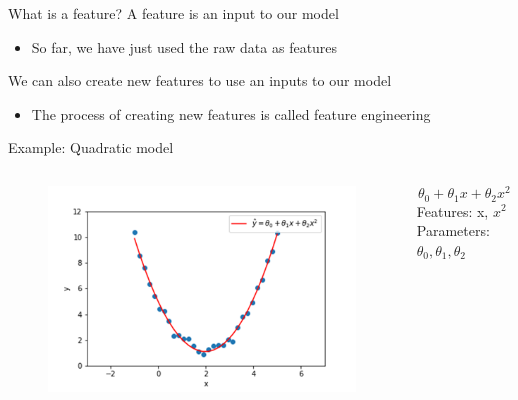 \documentclass[aspectratio=169]{../latex_main/tntbeamer}  %
\begin{document}
	
	\begin{frame}{What is a feature?}
	    A feature is an input to our model
	    \begin{itemize}
	        \item So far, we have just used the raw data as features
	    \end{itemize}
	    We can also create new features to use an inputs to our model
	    \begin{itemize}
	        \item The process of creating new features is called feature engineering
	    \end{itemize}
	    Example: Quadratic model
	    \begin{columns}
	        \begin{column}{.4\textwidth}
	                \begin{figure}
                	        \centering
                	        \includegraphics[scale=.35]{Bild3}
	                 \end{figure}
	        \end{column}
	        
	        
	        \begin{column}{.4\textwidth}
	            \bigskip
	             
	              
	               \begin{equation*}
	                   \theta_0 + \theta_1x + \theta_2x^2 
	               \end{equation*} 
	               Features: x, $x^2$\\
	               Parameters: $\theta_0, \theta_1, \theta_2$

	        \end{column}
	    \end{columns}
	\end{frame}
	
\end{document}
